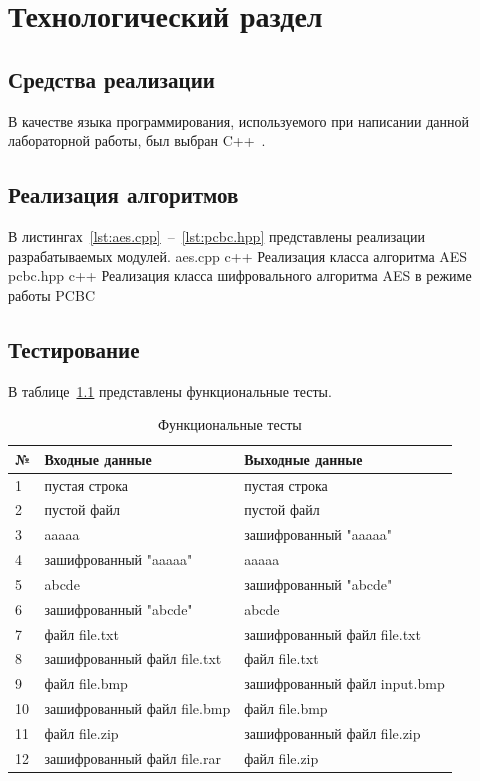 \chapter{Технологический раздел}

\section{Средства реализации}

В качестве языка программирования, используемого при написании данной лабораторной работы, был выбран C++~\cite{cpp-lang}.
	
\section{Реализация алгоритмов}

В листингах~\ref{lst:aes.cpp}~--~\ref{lst:pcbc.hpp} представлены реализации разрабатываемых модулей.
	{aes.cpp}
	{c++}
	{Реализация класса алгоритма AES}
	{pcbc.hpp}
	{c++}
	{Реализация класса шифровального алгоритма AES в режиме работы PCBC}

\clearpage

\section{Тестирование}
В таблице~\ref{tbl:functional_test} представлены функциональные тесты.
\begin{table}[ht!]
	\begin{center}
		\captionsetup{justification=raggedright,singlelinecheck=off}
		\caption{\label{tbl:functional_test} Функциональные тесты}
		\begin{tabular}{|m{1em}|m{15em}|m{15em}|}
			\hline
			№ & Входные данные & Выходные данные \\ 
			\hline
			1 & пустая строка & пустая строка \\
			\hline
			2 & пустой файл & пустой файл \\
			\hline
			3 & aaaaa & зашифрованный "aaaaa" \\
			\hline
			4 & зашифрованный "aaaaa" & aaaaa \\
			\hline
			5 & abcde & зашифрованный "abcde" \\
			\hline
			6 & зашифрованный "abcde" & abcde \\
			\hline
			7 & файл file.txt & зашифрованный файл file.txt \\
			\hline
			8 & зашифрованный файл file.txt & файл file.txt \\
			\hline
			9 & файл file.bmp & зашифрованный файл input.bmp \\
			\hline
			10 & зашифрованный файл file.bmp & файл file.bmp \\
			\hline
			11 & файл file.zip & зашифрованный файл file.zip \\
			\hline
			12 & зашифрованный файл file.rar & файл file.zip \\
			\hline
		\end{tabular}
	\end{center}
\end{table}

